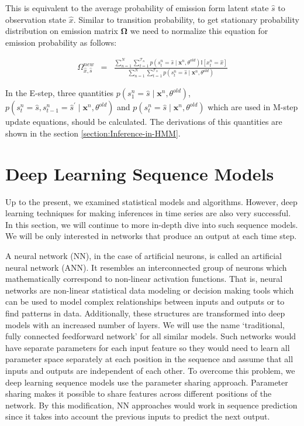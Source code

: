 This is equivalent to the average probability of emission form latent state $\hat{s}$ to observation state $\hat{x}$. Similar to transition probability, to get stationary probability distribution on emission matrix $\boldsymbol{\Omega}$ we need to normalize this equation for emission probability as follows:

\begin{eqnarray}
    \Omega_{\hat{x}, \hat{s}}^{new} &=& \frac{\sum_{n=1}^{N} \sum_{t=1}^{\mathcal{T}_{n}} p\left(s_{t}^n=\hat{s} \mid \boldsymbol{x}^{n}, \theta^{old}\right) \mathbb{I}\left[x_{t}^{n}=\hat{x}\right]} {\sum_{n=1}^{N} \sum_{t=1}^{\mathcal{T}_{n}} p\left(s_{t}^n=\hat{s} \mid \boldsymbol{x}^{n}, \theta^{old}\right)}
\end{eqnarray}

In the E-step, three quantities $p\left(s_{1}^{n}=\hat{s} \mid \boldsymbol{x}^{n}, \theta^{old}\right)$, $p\left(s_{t}^n=\hat{s}, s_{t-1}^n=\hat{s}^{\prime} \mid \boldsymbol{x}^{n}, \theta^{old}\right)$ and $ p\left(s_{t}^n=\hat{s} \mid \boldsymbol{x}^{n}, \theta^{old}\right)$ which are used in M-step update equations, should be calculated. The derivations of this quantities are shown in the section \ref{section:Inference-in-HMM}.

\section{Deep Learning Sequence Models}

Up to the present, we examined statistical models and algorithms. 
However, deep learning techniques for making inferences in time series are also very successful. In this section, we will continue to more in-depth dive into such sequence models. We will be only interested in networks that produce an output at each time step.

A neural network (NN), in the case of artificial neurons, is called an artificial neural network (ANN). It resembles an interconnected group of neurons which mathematically correspond to non-linear activation functions. 
That is, neural networks are non-linear statistical data modeling or decision making tools which can be used to model complex relationships between inputs and outputs or to find patterns in data. 
Additionally, these structures are transformed into deep models with an increased number of layers.
We will use the name `traditional, fully connected feedforward network' for all similar models.
Such networks would have separate parameters for each input feature so they would need to learn all parameter space separately at each position in the sequence and assume that all inputs and outputs are independent of each other. 
To overcome this problem, we deep learning sequence models use the parameter sharing approach. 
Parameter sharing makes it possible to share features across different positions of the network.
By this modification, NN approaches would work in sequence prediction since it takes into account the previous inputs to predict the next output.

